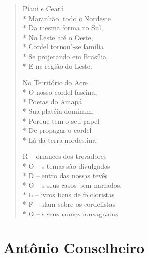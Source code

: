 \begin{verse}
Piaui e Ceará\\*
Maranhão, todo o Nordeste\\*
Da mesma forma no Sul,\\*
No Leste até o Oeste,\\*
Cordel tornou"-se família\\*
Se projetando em Brasília,\\*
E na região do Leste.

No Território do Acre\\*
O nosso cordel fascina,\\*
Poetas do Amapá\\*
Sua platéia dominam.\\*
Porque tem o seu papel\\*
De propagar o cordel\\*
Lá da terra nordestina.

R -- omances dos trovadores\\*
O -- s temas são divulgados\\*
D -- entro das nossas tevês\\*
O -- s seus casos bem narrados,\\*
L -- ivros bons de folcloristas\\*
F -- alam sobre os cordelistas\\*
O -- s seus nomes consagrados.
\end{verse}

\chapter{Antônio Conselheiro}

